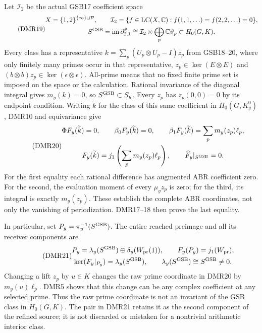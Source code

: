 Let $\mathcal I_2$ be the actual GSB17 coefficient space
\begin{equation}\tag{DMR19}
\begin{gathered}
X=\{1,2\}^{\{\infty\}\sqcup\mathcal P},\qquad
\mathcal I_2=\{f\in\operatorname{LC}(X,\mathbb C):
                f(1,1,\ldots)=f(2,2,\ldots)=0\},\\
S^{\rm GSB}=\operatorname{im}\partial^\theta_{2,1}
 \cong\mathcal I_2\otimes\bigoplus_p\mathbb C\vartheta_p
 \subset H_0(G,K).
\end{gathered}
\end{equation}
Every class has a representative $k=\sum_p(U_p\otimes U_p-I)z_p$
from GSB18--20, where only finitely many primes occur in that
representative, $z_p\in\ker(E\otimes E)$ and
$(b\otimes b)z_p\in\ker(\epsilon\otimes\epsilon)$.
All-prime means that no fixed finite prime set is imposed on
the space or the calculation. Rational invariance of the
diagonal integral gives $m_y(k)=0$, so $S^{\rm GSB}\subset S_y$.
Every $z_p$ has $z_p(0,0)=0$ by its endpoint condition.
Writing $\widetilde k$ for the class of this same coefficient
in $H_0(G,K_y^0)$, DMR10 and equivariance give
\begin{equation}\tag{DMR20}
\begin{gathered}
\Phi F_y(\widetilde k)=0,\qquad
\beta_0F_y(\widetilde k)=0,\qquad
\beta_1F_y(\widetilde k)=\sum_pm_y(z_p)\ell_p,\\
F_y(\widetilde k)=j_1\left(\sum_pm_y(z_p)\ell_p\right),
\qquad
\widehat F_y|_{S^{\rm GSB}}=0.
\end{gathered}
\end{equation}
For the first equality each rational difference has augmented
ABR coefficient zero. For the second, the evaluation moment
of every $\mu_yz_p$ is zero; for the third, its integral is
exactly $m_y(z_p)$. These establish the complete ABR coordinates,
not only the vanishing of periodization. DMR17--18 then prove
the last equality.

In particular, set $P_y=\pi_y^{-1}(S^{\rm GSB})$. The entire
reached preimage and all its receiver components are
\begin{equation}\tag{DMR21}
\begin{gathered}
P_y=\lambda_y(S^{\rm GSB})\oplus\delta_y(W_{\rm pr}(1)),\qquad
F_y(P_y)=j_1(W_{\rm pr}),\\
\ker(F_y|_{P_y})=\lambda_y(S^{\rm GSB}),\qquad
\lambda_y(S^{\rm GSB})\cong S^{\rm GSB}\ne0.
\end{gathered}
\end{equation}
Changing a lift $z_p$ by $u\in K$ changes the raw prime
coordinate in DMR20 by $m_y(u)\ell_p$. DMR5 shows that this
change can be any complex coefficient at any selected prime.
Thus the raw prime coordinate is not an invariant of the GSB
class in $H_0(G,K)$. The pair in DMR21 retains it as the
second component of the refined source; it is not discarded
or mistaken for a nontrivial arithmetic interior class.

